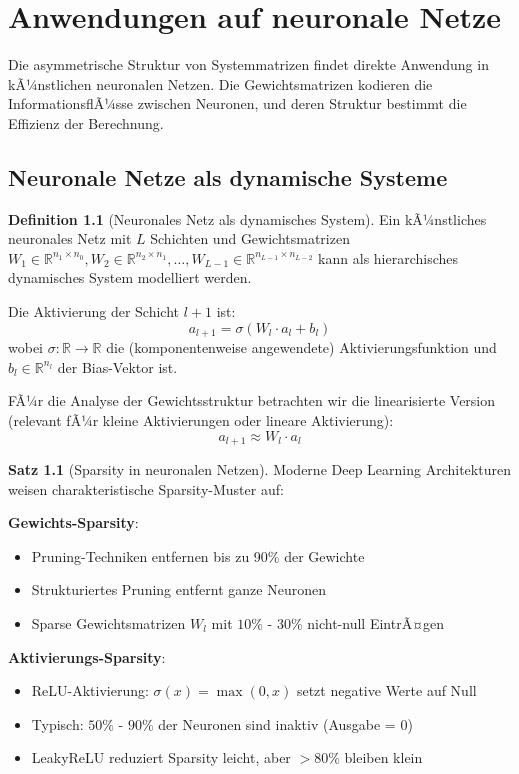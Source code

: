﻿\documentclass[a4paper,12pt]{report}
\theoremstyle{definition}
\newtheorem{definition}{Definition}
\newtheorem{satz}{Satz}
\begin{document}
	\chapter{Anwendungen auf neuronale Netze}
	
	Die asymmetrische Struktur von Systemmatrizen findet direkte Anwendung in kÃ¼nstlichen neuronalen Netzen. Die Gewichtsmatrizen kodieren die InformationsflÃ¼sse zwischen Neuronen, und deren Struktur bestimmt die Effizienz der Berechnung.
	
	\section{Neuronale Netze als dynamische Systeme}
	
	\begin{definition}[Neuronales Netz als dynamisches System]
		Ein kÃ¼nstliches neuronales Netz mit $L$ Schichten und Gewichtsmatrizen $W_1 \in \mathbb{R}^{n_1 \times n_0}, W_2 \in \mathbb{R}^{n_2 \times n_1}, \ldots, W_{L-1} \in \mathbb{R}^{n_{L-1} \times n_{L-2}}$ kann als hierarchisches dynamisches System modelliert werden.
		
		Die Aktivierung der Schicht $l+1$ ist:
		\[
		a_{l+1} = \sigma(W_l \cdot a_l + b_l)
		\]
		wobei $\sigma : \mathbb{R} \to \mathbb{R}$ die (komponentenweise angewendete) Aktivierungsfunktion und $b_l \in \mathbb{R}^{n_l}$ der Bias-Vektor ist.
		
		FÃ¼r die Analyse der Gewichtsstruktur betrachten wir die linearisierte Version (relevant fÃ¼r kleine Aktivierungen oder lineare Aktivierung):
		\[
		a_{l+1} \approx W_l \cdot a_l
		\]
	\end{definition}
	
	\begin{satz}[Sparsity in neuronalen Netzen]
		Moderne Deep Learning Architekturen weisen charakteristische Sparsity-Muster auf:
		
		\textbf{Gewichts-Sparsity}:
		\begin{itemize}
			\item Pruning-Techniken entfernen bis zu 90\% der Gewichte
			\item Strukturiertes Pruning entfernt ganze Neuronen
			\item Sparse Gewichtsmatrizen $W_l$ mit $10\%$ - $30\%$ nicht-null EintrÃ¤gen
		\end{itemize}
		
		\textbf{Aktivierungs-Sparsity}:
		\begin{itemize}
			\item ReLU-Aktivierung: $\sigma(x) = \max(0, x)$ setzt negative Werte auf Null
			\item Typisch: $50\%$ - $90\%$ der Neuronen sind inaktiv (Ausgabe = 0)
			\item LeakyReLU reduziert Sparsity leicht, aber $>80\%$ bleiben klein
		\end{itemize}
	\end{satz}
	
\end{document}
